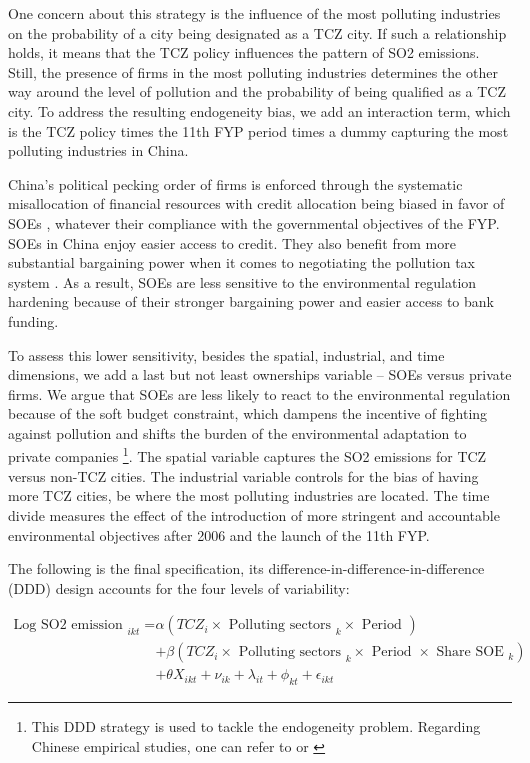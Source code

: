\documentclass[12pt]{article}
\begin{document}
One concern about this strategy is the influence of the most polluting industries on the probability of a city being designated as a TCZ city. If such a relationship holds, it means that the TCZ policy influences the pattern of SO2 emissions. Still, the presence of firms in the most polluting industries determines the other way around the level of pollution and the probability of being qualified as a TCZ city. To address the resulting endogeneity bias, we add an interaction term, which is the TCZ policy times the 11th FYP period times a dummy capturing the most polluting industries in China. 

China's political pecking order of firms is enforced through the systematic misallocation of financial resources \citep{Dollar2007-dr} with credit allocation being biased in favor of SOEs \citep{Brandt2003-hu, Ferri2009-lh, Hale2011-ma, Huang2003-oa}, whatever their compliance with the governmental objectives of the FYP. SOEs in China enjoy easier access to credit. They also benefit from more substantial bargaining power when it comes to negotiating the pollution tax system \citep{Wang2003-ar, Wang2005-yy}. As a result, SOEs are less sensitive to the environmental regulation hardening because of their stronger bargaining power and easier access to bank funding. 

To assess this lower sensitivity, besides the spatial, industrial, and time dimensions, we add a last but not least ownerships variable – SOEs versus private firms. We argue that SOEs are less likely to react to the environmental regulation because of the soft budget constraint, which dampens the incentive of fighting against pollution and shifts the burden of the environmental adaptation to private companies \footnote{This DDD strategy is used to tackle the endogeneity problem. Regarding Chinese empirical studies, one can refer to \cite{Chen2018-bs,Shi2018-zk, Hering2014-af} or \cite{Cai2016-br}}. The spatial variable captures the SO2 emissions for TCZ versus non-TCZ cities. The industrial variable controls for the bias of having more TCZ cities, be where the most polluting industries are located. The time divide measures the effect of the introduction of more stringent and accountable environmental objectives after 2006 and the launch of the 11th FYP. 

The following is the final specification, its difference-in-difference-in-difference (DDD) design accounts for the four levels of variability: 

\begin{equation} \label{eq:main}
\begin{aligned} 
\text {Log SO2 emission }_{i k t}=& \alpha (T C Z_{i} \times \text { Polluting sectors }_{k} \times \text { Period }) \\ &+\beta (T C Z_{i} \times \text { Polluting sectors }_{k} \times \text { Period } \times \text { Share SOE }_{k}) \\ & +\theta {X}_{i k t}+\nu_{ik}+\lambda_{it} +\phi_{kt} +\epsilon_{ikt} 
\end{aligned}
\end{equation}
\end{document}
